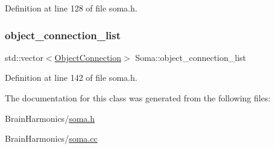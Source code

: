 Definition at line 128 of file soma.\+h.

\mbox{\label{class_soma_a84739acd533862b115bd5cbe56da6c98}} 
\subsubsection{\texorpdfstring{object\+\_\+connection\+\_\+list}{object\_connection\_list}}
{\footnotesize\ttfamily std\+::vector$<$\mbox{\hyperlink{struct_soma_1_1_object_connection}{Object\+Connection}}$>$ Soma\+::object\+\_\+connection\+\_\+list\hspace{0.3cm}{\ttfamily [protected]}}



Definition at line 142 of file soma.\+h.



The documentation for this class was generated from the following files\+:\begin{DoxyCompactItemize}
\item 
Brain\+Harmonics/\mbox{\hyperlink{soma_8h}{soma.\+h}}\item 
Brain\+Harmonics/\mbox{\hyperlink{soma_8cc}{soma.\+cc}}\end{DoxyCompactItemize}
